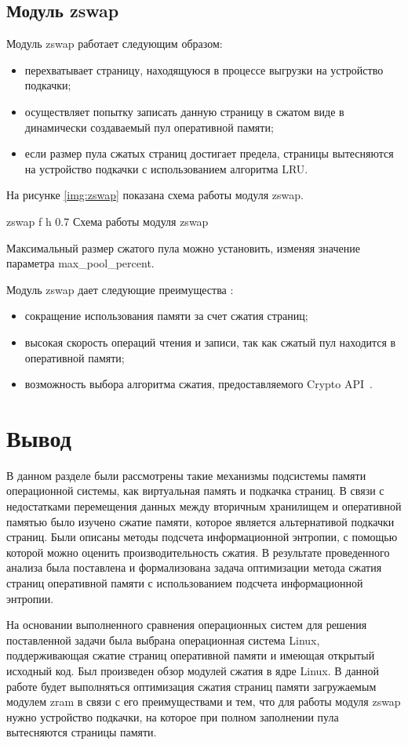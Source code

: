 \subsection{Модуль zswap}

Модуль zswap работает следующим образом:

\begin{itemize}
    \item перехватывает страницу, находящуюся в процессе выгрузки на устройство подкачки;
    \item осуществляет попытку записать данную страницу в сжатом виде в динамически создаваемый пул оперативной памяти;
    \item если размер пула сжатых страниц достигает предела, страницы вытесняются на устройство подкачки с использованием алгоритма LRU.
\end{itemize}

На рисунке \ref{img:zswap} показана схема работы модуля zswap.

    {zswap}
    {f}
    {h}
    {0.7\textwidth}
    {Схема работы модуля zswap}

Максимальный размер сжатого пула можно установить, изменяя значение параметра max\_pool\_percent.

Модуль zswap дает следующие преимущества \cite{zswap}:

\begin{itemize}
	\item сокращение использования памяти за счет сжатия страниц;
	\item высокая скорость операций чтения и записи, так как сжатый пул находится в оперативной памяти;
    \item возможность выбора алгоритма сжатия, предоставляемого Crypto API~\cite{crypto}.
\end{itemize}

\section*{Вывод}

В данном разделе были рассмотрены такие механизмы подсистемы памяти операционной системы, как виртуальная память и подкачка страниц. В связи с недостатками перемещения данных между вторичным хранилищем и оперативной памятью было изучено сжатие памяти, которое является альтернативой подкачки страниц. Были описаны методы подсчета информационной энтропии, с помощью которой можно оценить производительность сжатия. В результате проведенного анализа была поставлена и формализована задача оптимизации метода сжатия страниц оперативной памяти с использованием подсчета информационной энтропии.

На основании выполненного сравнения операционных систем для решения поставленной задачи была выбрана операционная система Linux, поддерживающая сжатие страниц оперативной памяти и имеющая открытый исходный код. Был произведен обзор модулей сжатия в ядре Linux. В данной работе будет выполняться оптимизация сжатия страниц памяти загружаемым модулем zram в связи с его преимуществами и тем, что для работы модуля zswap нужно устройство подкачки, на которое при полном заполнении пула вытесняются страницы памяти.
